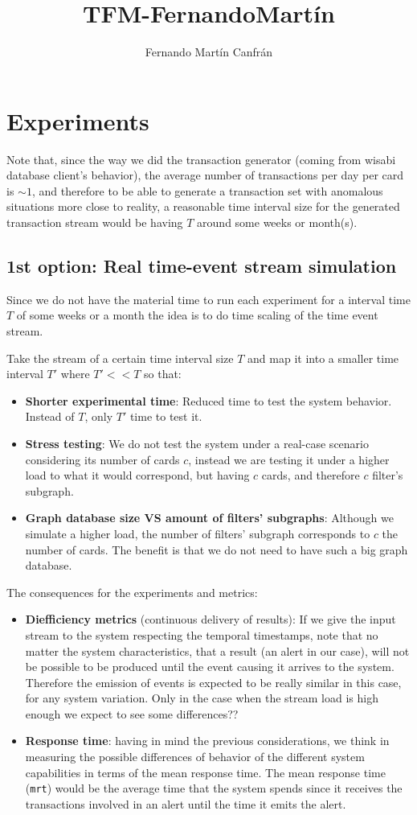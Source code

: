 \documentclass{article}
\title{TFM-FernandoMartín}
\author{Fernando Martín Canfrán}
\begin{document}
\section{Experiments}

Note that, since the way we did the transaction generator (coming from wisabi database client's behavior), the average number of transactions per day per card is $\sim1$, and therefore to be able to generate a transaction set with anomalous situations more close to reality, a reasonable time interval size for the generated transaction stream would be having $T$ around some weeks or month(s).

\subsection{1st option: Real time-event stream simulation}

Since we do not have the material time to run each experiment for a interval time $T$ of some weeks or a month the idea is to do time scaling of the time event stream.

Take the stream of a certain time interval size $T$ and map it into a smaller time interval
$T'$ where $T' << T$ so that:
\begin{itemize}
  \item \textbf{Shorter experimental time}: Reduced time to test the system behavior. Instead of $T$, only $T'$ time to test it. 
  \item \textbf{Stress testing}: We do not test the system under a real-case scenario considering its number of cards $c$, instead we are testing it under a higher load to what it would correspond, but having $c$ cards, and therefore $c$ filter's subgraph.
  \item \textbf{Graph database size VS amount of filters' subgraphs}: Although we simulate a higher load, the number of filters' subgraph corresponds to $c$ the number of cards. The benefit is that we do not need to have such a big graph database.
\end{itemize}

The consequences for the experiments and metrics:

\begin{itemize}
  \item \textbf{Diefficiency metrics} (continuous delivery of results): If we give the input stream to the system respecting the temporal timestamps, note that no matter the system characteristics, that a result (an alert in our case), will not be possible to be produced until the event causing it arrives to the system. Therefore the emission of events is expected to be really similar in this case, for any system variation. Only in the case when the stream load is high enough we expect to see some differences??
  \item \textbf{Response time}: having in mind the previous considerations, we think in measuring the possible differences of behavior of the different system capabilities in terms of the mean response time. The mean response time (\texttt{mrt}) would be the average time that the system spends since it receives the transactions involved in an alert until the time it emits the alert.
\end{itemize}
\end{document}
